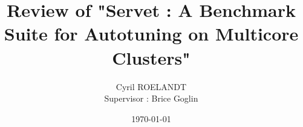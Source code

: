 \documentclass[twocolumn]{article}
\author{
Cyril ROELANDT \\
Supervisor : Brice Goglin
}
\date{\today}
\title{Review of "Servet : A Benchmark Suite for Autotuning on Multicore
Clusters"}
\begin{document}
\maketitle





\nocite{*}


\end{document}
